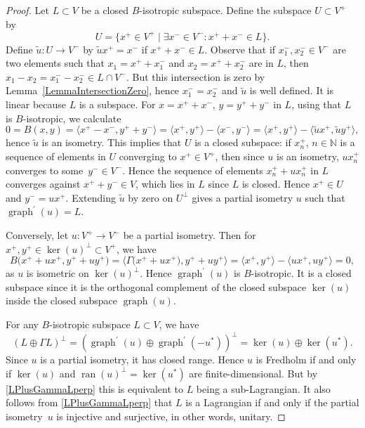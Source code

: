 \documentclass[pdftex]{sigma}
\numberwithin{equation}{section}
\DeclareMathOperator*{\ran}{ran}
\DeclareMathOperator{\graph}{\mathrm{graph}}
\newcommand{\N}{\mathbb{N}}
\begin{document}
\begin{proof}
Let $L \subset V$ be a closed $B$-isotropic subspace.
Define the subspace $U \subset V^+$ by
\begin{equation*}
U = \big\{x^+ \in V^+ \mid \exists x^- \in V^- \colon x^+ + x^- \in L\big\}.
\end{equation*}
Define $\tilde{u}\colon U \to V^-$ by $\tilde{u}x^+ = x^-$ if $x^+ + x^- \in L$.
Observe that if $x^-_1, x^-_2 \in V^-$ are two elements such that $x_1= x^+ + x^-_1$ and $x_2 = x^+ + x^-_2$ are in $L$, then $x_1 - x_2 = x^-_1 - x^-_2 \in L \cap V^-$.
But this intersection is zero by Lemma~\ref{LemmaIntersectionZero}, hence $x^-_1 = x^-_2$ and $\tilde{u}$ is well defined.
It is linear because $L$ is a subspace.
For $x = x^+ + x^-$, $y = y^+ + y^-$ in $L$, using that $L$ is $B$-isotropic, we calculate
\begin{equation*}
 0 = B(x, y) = \big\langle x^+ - x^-, y^+ + y^-\big\rangle = \big\langle x^+, y^+\big\rangle - \big\langle x^-, y^-\big\rangle = \big\langle x^+, y^+\big\rangle - \big\langle \tilde{u}x^+, \tilde{u}y^+\big\rangle,
\end{equation*}
hence $\tilde{u}$ is an isometry.
This implies that $U$ is a closed subspace: if $x_n^+$, $n \in \N$ is a sequence of elements in $U$ converging to $x^+ \in V^+$, then since $u$ is an isometry, $ux_n^+$ converges to some~${y^- \in V^-}$.
Hence the sequence of elements $x_n^+ + u x_n^+$ in $L$ converges against $x^+ + y^- \in V$, which lies in $L$ since $L$ is closed.
Hence $x^+ \in U$ and $y^- = u x^+$.
Extending $\tilde{u}$ by zero on $U^\perp$ gives a partial isometry $u$ such that $\graph^\prime(u) = L$.

Conversely, let $u \colon V^+ \to V^-$ be a partial isometry.
Then for $x^+, y^+ \in \ker(u)^\perp \subset V^+$, we have
\begin{equation*}
 B\big(x^+ + u x^+, y^+ + u y^+\big) = \big\langle \Gamma\big(x^+ + u x^+\big), y^+ + u y^+ \big\rangle = \big\langle x^+, y^+\big\rangle - \big\langle ux^+, uy^+\big\rangle = 0,
\end{equation*}
as $u$ is isometric on $\ker(u)^\perp$.
Hence $\graph^\prime(u)$ is $B$-isotropic.
It is a closed subspace since it is the orthogonal complement of the closed subspace $\ker(u)$ inside the closed subspace $\graph(u)$.

For any $B$-isotropic subspace $L \subset V$, we have
\begin{equation} \label{LPlusGammaLperp}
(L \oplus \Gamma L)^\perp = (\graph^\prime(u) \oplus \graph^\prime(-u^*))^\perp = \ker(u) \oplus \ker(u^*).
\end{equation}
Since $u$ is a partial isometry, it has closed range.
Hence $u$ is Fredholm if and only if $\ker(u)$ and $\ran(u)^\perp = \ker(u^*)$ are finite-dimensional.
But by \eqref{LPlusGammaLperp} this is equivalent to $L$ being a sub-Lagrangian.
It also follows from \eqref{LPlusGammaLperp} that $L$ is a Lagrangian if and only if the partial isometry~$u$ is injective and surjective, in other words, unitary.
\end{proof}
\end{document}
